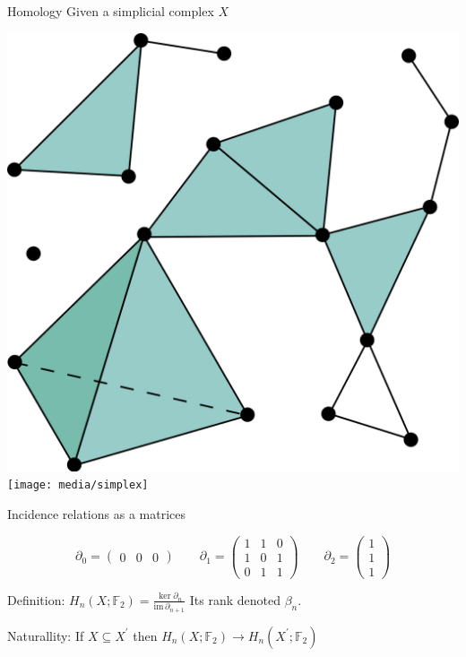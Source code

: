 \documentclass[10pt,t, handout]{beamer} %
\begin{document}
\begin{frame}[c]{Homology}
	Given a simplicial complex $X$
	\begin{center}
		\includegraphics[scale=.05]{media/simplicial_complex}
		\qquad\qquad
		\pause
		\texttt{[image: media/simplex]}
	\end{center}

	Incidence relations as a matrices

	\begin{equation*}
	\partial_0 =
	\begin{pmatrix}
	0 & 0 & 0
	\end{pmatrix}
	\qquad
	\partial_1 =
	\begin{pmatrix}
	1 & 1 & 0 \\
	1 & 0 & 1 \\
	0 & 1 & 1
	\end{pmatrix}
	\qquad
	\partial_2 =
	\begin{pmatrix}
	1 \\
	1 \\
	1
	\end{pmatrix}
	\end{equation*}

	\vskip 5pt
	\pause

	\textcolor{pblue}{Definition:} $\displaystyle{H_n(X; \mathbb F_2) = \frac{\ker \partial_n}{\mathrm{im}\, \partial_{n+1}}}$ \quad Its rank denoted $\beta_n$.

	\vskip 15pt
	\pause

	\textcolor{pblue}{Naturallity:}
	If $X \subseteq X^\prime$ then $H_n(X; \mathbb F_2) \to H_n(X^\prime; \mathbb F_2)$
\end{frame}
\end{document}
